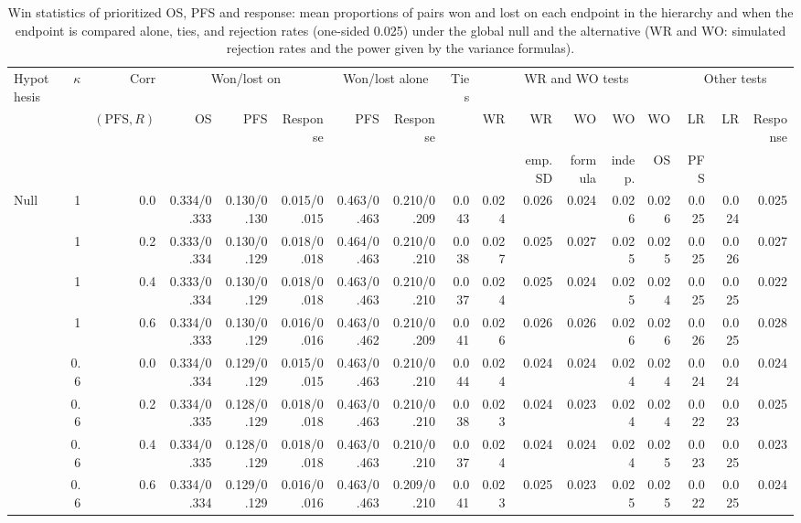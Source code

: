 \begin{table}[htbp]
\centering
\caption{Win statistics of prioritized OS, PFS and response: mean proportions of pairs won and lost on each endpoint in the hierarchy and when the endpoint is compared alone, ties, and rejection rates (one-sided 0.025) under the global null and the alternative (WR and WO: simulated rejection rates and the power given by the variance formulas).}
\label{tab:winfull}
\begin{threeparttable}
\scriptsize\setlength{\tabcolsep}{2pt}
\begin{tabular}{lrrrrrrrrrrrrrrrr}
\toprule
Hypothesis & $\kappa$ & $\mathrm{Corr}$ & \multicolumn{3}{c}{Won/lost on} & \multicolumn{2}{c}{Won/lost alone} & Ties & \multicolumn{5}{c}{WR and WO tests} & \multicolumn{3}{c}{Other tests} \\
\cmidrule(lr){4-6} \cmidrule(lr){7-8} \cmidrule(lr){10-14} \cmidrule(lr){15-17}
 &  & $(\mathrm{PFS}, R)$ & OS & PFS & Response & PFS & Response &  & WR & WR & WO & WO & WO & LR & LR & Response \\
 &  &  &  &  &  &  &  &  &  & emp. SD & formula & indep. & OS & PFS &  \\
\midrule
Null & 1 & 0.0 & 0.334/0.333 & 0.130/0.130 & 0.015/0.015 & 0.463/0.463 & 0.210/0.209 & 0.043 & 0.024 & 0.026 & 0.024 & 0.026 & 0.026 & 0.025 & 0.024 & 0.025 \\
 & 1 & 0.2 & 0.333/0.334 & 0.130/0.129 & 0.018/0.018 & 0.464/0.463 & 0.210/0.210 & 0.038 & 0.027 & 0.025 & 0.027 & 0.025 & 0.025 & 0.025 & 0.026 & 0.027 \\
 & 1 & 0.4 & 0.333/0.334 & 0.130/0.129 & 0.018/0.018 & 0.463/0.463 & 0.210/0.210 & 0.037 & 0.024 & 0.025 & 0.024 & 0.025 & 0.024 & 0.025 & 0.025 & 0.022 \\
 & 1 & 0.6 & 0.334/0.333 & 0.130/0.129 & 0.016/0.016 & 0.463/0.462 & 0.210/0.209 & 0.041 & 0.026 & 0.026 & 0.026 & 0.026 & 0.026 & 0.026 & 0.025 & 0.028 \\
 & 0.6 & 0.0 & 0.334/0.334 & 0.129/0.129 & 0.015/0.015 & 0.463/0.463 & 0.210/0.210 & 0.044 & 0.024 & 0.024 & 0.024 & 0.024 & 0.024 & 0.024 & 0.024 & 0.024 \\
 & 0.6 & 0.2 & 0.334/0.335 & 0.128/0.129 & 0.018/0.018 & 0.463/0.463 & 0.210/0.210 & 0.038 & 0.023 & 0.024 & 0.023 & 0.024 & 0.024 & 0.022 & 0.023 & 0.025 \\
 & 0.6 & 0.4 & 0.334/0.335 & 0.128/0.129 & 0.018/0.018 & 0.463/0.463 & 0.210/0.210 & 0.037 & 0.024 & 0.024 & 0.024 & 0.024 & 0.025 & 0.023 & 0.025 & 0.023 \\
 & 0.6 & 0.6 & 0.334/0.334 & 0.129/0.129 & 0.016/0.016 & 0.463/0.463 & 0.209/0.210 & 0.041 & 0.023 & 0.025 & 0.023 & 0.025 & 0.025 & 0.022 & 0.025 & 0.024 \\

\end{tabular}
\end{threeparttable}
\end{table}

